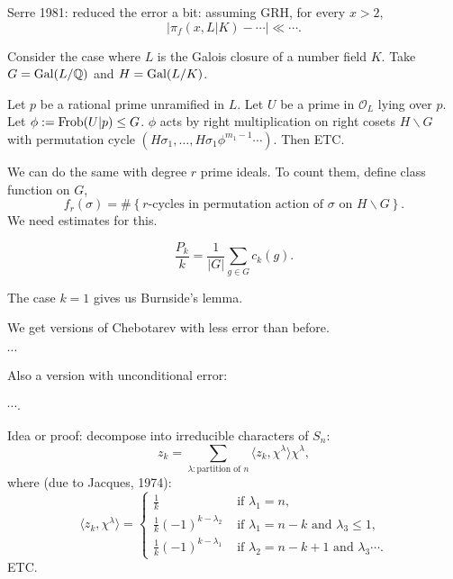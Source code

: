 \documentclass[reqno]{amsart} 
\begin{document}
Serre 1981: reduced the error a bit: assuming GRH, for every $x > 2$,
\begin{equation*}
  \left| \pi_f(x, L|K) - \dotsb \right| \ll \dotsb.
\end{equation*}

Consider the case where $L$ is the Galois closure of a number field $K$.  Take $G = \operatorname{Gal}(L / \mathbb{Q})$ and $H = \operatorname{Gal}(L/K)$.
\begin{theorem}[Frobenius]
  Let $p$ be a rational prime unramified in $L$.  Let $U$ be a prime in $\mathcal{O}_L$ lying over $p$.  Let $\phi := \operatorname{Frob}(U | p) \leq G$.  $\phi$ acts by right multiplication on right cosets $H \backslash G$ with permutation cycle $(H \sigma_1, \dotsc, H \sigma_1 \phi^{m_1 - 1} \dotsb)$.  Then ETC.
\end{theorem}

We can do the same with degree $r$ prime ideals.  To count them, define class function on $G$,
\begin{equation*}
  f_r(\sigma) = \# \left\{\text{$r$-cycles in permutation action of $\sigma$ on $H \backslash G$} \right\}.
\end{equation*}
We need estimates for this.

\begin{theorem}[Parker]
  \begin{equation*}
    \frac{P_k}{k} = \frac{1}{\lvert G \rvert} \sum_{g \in G} c_k(g).
  \end{equation*}
\end{theorem}
The case $k = 1$ gives us Burnside's lemma.

We get versions of Chebotarev with less error than before.

\begin{theorem}
  $\dotsb$
\end{theorem}

Also a version with unconditional error:
\begin{theorem}
  $\dotsb$.
\end{theorem}

Idea or proof: decompose into irreducible characters of $S_n$:
\begin{equation*}
  z_k = \sum_{\lambda : \text{partition of } n}
  \langle z_k, \chi^\lambda \rangle \chi^\lambda,
\end{equation*}
where (due to Jacques, 1974):
\begin{equation*}
  \langle z_k, \chi^\lambda \rangle
  =
  \begin{cases}
    \frac{1}{k}    & \text{ if } \lambda_1 = n, \\
    \frac{1}{k}(-1)^{k - \lambda_2}                   & \text{ if } \lambda_1 = n - k \text{ and } \lambda_3 \leq 1, \\
    \frac{1}{k}(- 1)^{k - \lambda_1}                   & \text{ if } \lambda_2 = n - k + 1 \text{ and } \lambda_3 \dotsb.
  \end{cases}
\end{equation*}
ETC.
\end{document}
